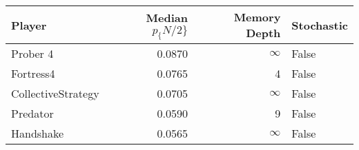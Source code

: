 \begin{tabular}{lrrl}
\toprule
             Player &  Median $p_\{N/2\}$ &  Memory Depth & Stochastic \\
\midrule
           Prober 4 &            0.0870 &            \(\infty\) &      False \\
          Fortress4 &            0.0765 &             4 &      False \\
 CollectiveStrategy &            0.0705 &            \(\infty\) &      False \\
           Predator &            0.0590 &             9 &      False \\
          Handshake &            0.0565 &            \(\infty\) &      False \\
\bottomrule
\end{tabular}
